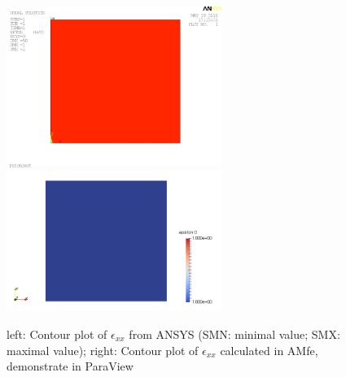 \begin{figure}
	\begin{center}
		\includegraphics[width=7cm,clip]{PatchTest.png} 		
		\includegraphics[width=7cm,clip]{PatchParaView.pdf} 		
		\caption{left: Contour plot of $\epsilon_{xx}$ from ANSYS (SMN: minimal value; SMX: maximal value); right: Contour plot of $\epsilon_{xx}$ calculated in AMfe, demonstrate in ParaView} \label{fig: PatchTest}
	\end{center}
\end{figure}

